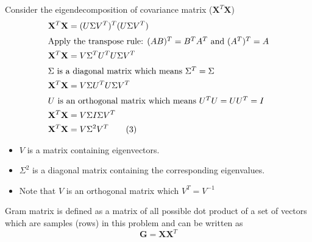 \documentclass[12pt, a4paper]{article}
\begin{document}
            \vspace{1em}

            \noindent Consider the eigendecomposition of covariance matrix ($\mathbf{X}^T \mathbf{X}$)
            \begin{align*}
                \mathbf{X}^T \mathbf{X} &= (U \Sigma V^T)^T (U \Sigma V^T) \\
                \intertext{Apply the transpose rule: $(AB)^T = B^T A^T$ and $(A^T)^T = A$}
                \mathbf{X}^T \mathbf{X} &= V \Sigma^T U^T U \Sigma V^T \\
                \intertext{$\Sigma$ is a diagonal matrix which means $\Sigma^T = \Sigma$}
                \mathbf{X}^T \mathbf{X} &= V \Sigma U^T U \Sigma V^T \\
                \intertext{$U$ is an orthogonal matrix which means $U^T U = U U^T = I$}
                \mathbf{X}^T \mathbf{X} &= V \Sigma I \Sigma V^T \\
                \mathbf{X}^T \mathbf{X} &= V \Sigma^2 V^T \tag{3}
            \end{align*}
            \begin{itemize}
                \item $V$ is a matrix containing eigenvectors.
                \item $\Sigma^2$ is a diagonal matrix containing the corresponding eigenvalues.
                \item Note that $V$ is an orthogonal matrix which $V^T = V^{-1}$
            \end{itemize}

            \vspace{1em}

            Gram matrix is defined as a matrix of all possible dot product of a set of vectors which are samples (rows) in this problem
            and can be written as
            $$\mathbf{G} = \mathbf{X} \mathbf{X}^T$$
\end{document}
